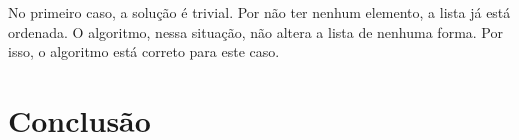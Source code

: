 \documentclass[a4paper, 10pt]{article}
\begin{document}
No primeiro caso, a solução é trivial. Por não ter nenhum elemento, a lista já está ordenada. O algoritmo, nessa situação, não altera a lista de nenhuma forma. Por isso, o algoritmo está correto para este caso.






\section{Conclusão}
\end{document}
